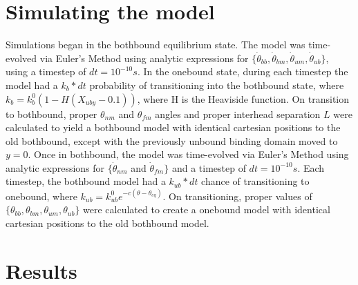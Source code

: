 \documentclass[9pt,twocolumn,twoside]{pnas-new}
\begin{document}
{  \section*{Simulating the model}
  Simulations began in the bothbound equilibrium state. The model was time-evolved via Euler's Method using analytic expressions for $\{\dot{\theta}_{bb}, \dot{\theta}_{bm}, \dot{\theta}_{um}, \dot{\theta}_{ub}\}$, using a timestep of $dt = 10^{-10}s$. In the onebound state, during each timestep the model had a $k_b*dt$ probability of transitioning into the bothbound state, where $k_b = k_b^0\left(1-H\left(X_{uby}-0.1\right)\right)$, where H is the Heaviside function. On transition to bothbound, proper $\theta_{nm}$ and $\theta_{fm}$ angles and proper interhead separation $L$ were calculated to yield a bothbound model with identical cartesian positions to the old bothbound, except with the previously unbound binding domain moved to $y=0$. Once in bothbound, the model was time-evolved via Euler's Method using analytic expressions for $\{\dot{\theta}_{nm}$ and $\dot{\theta}_{fm}\}$ and a timestep of $dt=10^{-10}s$. Each timestep, the bothbound model had a $k_{ub}*dt$ chance of transitioning to onebound, where $k_{ub} = k^0_{ub}e^{-c(\theta-\theta_{eq})}$. On transitioning, proper values of $\{\theta_{bb}, \theta_{bm}, \theta_{um}, \theta_{ub}\}$ were calculated to create a onebound model with identical cartesian positions to the old bothbound model.\\
}

\section{Results}
\end{document}
